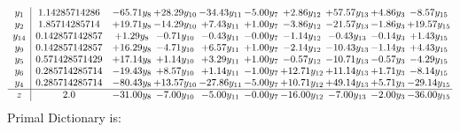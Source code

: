 \documentclass[9pt]{article}
\begin{document}
\[\begin{array}{c| c c@{\hskip 2pt} c@{\hskip 2pt} c@{\hskip 2pt} c@{\hskip 2pt} c@{\hskip 2pt} c@{\hskip 2pt} c@{\hskip 2pt} c@{\hskip 2pt} }
 y_{1}   &  1.14285714286 & -65.71 y_{8} & + 28.29 y_{10} & -34.43 y_{11} & -5.00 y_{7} & +  2.86 y_{12} & + 57.57 y_{13} & +  4.86 y_{3} & -8.57 y_{15}\\
 y_{2}   &  1.85714285714 & + 19.71 y_{8} & -14.29 y_{10} & +  7.43 y_{11} & +  1.00 y_{7} & -3.86 y_{12} & -21.57 y_{13} & -1.86 y_{3} & + 19.57 y_{15}\\
 y_{14}   &  0.142857142857 & +  1.29 y_{8} & -0.71 y_{10} & -0.43 y_{11} & -0.00 y_{7} & -1.14 y_{12} & -0.43 y_{13} & -0.14 y_{3} & +  1.43 y_{15}\\
 y_{9}   &  0.142857142857 & + 16.29 y_{8} & -4.71 y_{10} & +  6.57 y_{11} & +  1.00 y_{7} & -2.14 y_{12} & -10.43 y_{13} & -1.14 y_{3} & +  4.43 y_{15}\\
 y_{5}   &  0.571428571429 & + 17.14 y_{8} & +  1.14 y_{10} & +  3.29 y_{11} & +  1.00 y_{7} & -0.57 y_{12} & -10.71 y_{13} & -0.57 y_{3} & -4.29 y_{15}\\
 y_{6}   &  0.285714285714 & -19.43 y_{8} & +  8.57 y_{10} & +  1.14 y_{11} & -1.00 y_{7} & + 12.71 y_{12} & + 11.14 y_{13} & +  1.71 y_{3} & -8.14 y_{15}\\
 y_{4}   &  0.285714285714 & -80.43 y_{8} & + 13.57 y_{10} & -27.86 y_{11} & -5.00 y_{7} & + 10.71 y_{12} & + 49.14 y_{13} & +  5.71 y_{3} & -29.14 y_{15}\\
\hline
z    &  2.0 & -31.00 y_{8} & -7.00 y_{10} & -5.00 y_{11} & -0.00 y_{7} & -16.00 y_{12} & -7.00 y_{13} & -2.00 y_{3} & -36.00 y_{15}\\
\end{array}\]
Primal Dictionary is:
\end{document}
